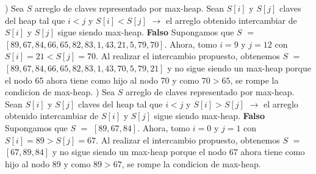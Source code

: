 \documentclass[10pt,a4paper]{article}
\begin{document}
\newline
{}) Sea $S$ arreglo de claves representado por max-heap. Sean $S[i]$ y $S[j]$ claves del heap tal que $i < j$ y $S[i] < S[j]$ $\rightarrow$ el arreglo obtenido intercambiar de $S[i]$ y $S[j]$ sigue siendo max-heap. \textbf{Falso}
\newline
\newline
Supongamos que $S$ $=$ $[89,67,84,66,65,82,83,1,43,21,5,79,70]$. Ahora, tomo $i = 9$ y $j = 12$ con $S[i] = 21 < S[j] = 70$.
\newline
\newline
Al realizar el intercambio propuesto, obtenemos $S$ $=$ $[89,67,84,66,65,82,83,1,43,70,5,79,21]$ y no sigue siendo un max-heap porque el nodo 65 ahora tiene como hijo al nodo 70 y como $70 > 65$, se rompe la condicion de max-heap.  
\newline
{}) Sea $S$ arreglo de claves representado por max-heap. Sean $S[i]$ y $S[j]$ claves del heap tal que $i < j$ y $S[i] > S[j]$ $\rightarrow$ el arreglo obtenido intercambiar de $S[i]$ y $S[j]$ sigue siendo max-heap. \textbf{Falso}
\newline
\newline
Supongamos que $S$ $=$ $[89,67,84]$. Ahora, tomo $i = 0$ y $j = 1$ con $S[i] = 89 > S[j] = 67$.
\newline
\newline
Al realizar el intercambio propuesto, obtenemos $S$ $=$ $[67,89,84]$ y no sigue siendo un max-heap porque el nodo 67 ahora tiene como hijo al nodo 89 y como $89 > 67$, se rompe la condicion de max-heap.  

 




\TipoVariable{}
\end{document}
